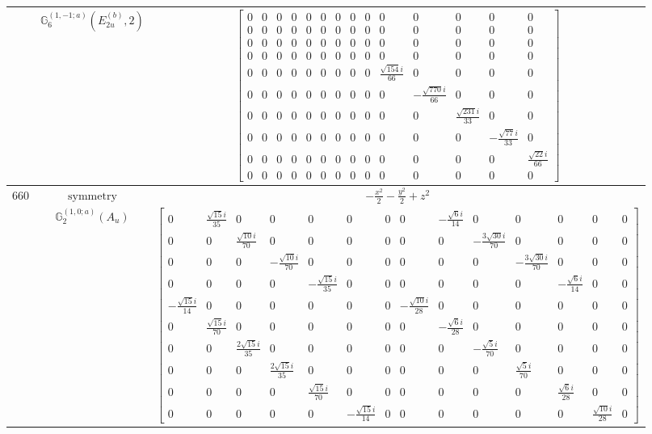 \documentclass[fleqn,8pt,landscape]{jsarticle}
\begin{document}
\begin{longtable}{ccc}
$  $ & $ \mathbb{G}_{6}^{(1,-1;a)}(E_{2u}^{(b)},2) $ & $ \begin{bmatrix} 0 & 0 & 0 & 0 & 0 & 0 & 0 & 0 & 0 & 0 & 0 & 0 & 0 & 0 \\ 0 & 0 & 0 & 0 & 0 & 0 & 0 & 0 & 0 & 0 & 0 & 0 & 0 & 0 \\ 0 & 0 & 0 & 0 & 0 & 0 & 0 & 0 & 0 & 0 & 0 & 0 & 0 & 0 \\ 0 & 0 & 0 & 0 & 0 & 0 & 0 & 0 & 0 & 0 & 0 & 0 & 0 & 0 \\ 0 & 0 & 0 & 0 & 0 & 0 & 0 & 0 & 0 & \frac{\sqrt{154} i}{66} & 0 & 0 & 0 & 0 \\ 0 & 0 & 0 & 0 & 0 & 0 & 0 & 0 & 0 & 0 & - \frac{\sqrt{770} i}{66} & 0 & 0 & 0 \\ 0 & 0 & 0 & 0 & 0 & 0 & 0 & 0 & 0 & 0 & 0 & \frac{\sqrt{231} i}{33} & 0 & 0 \\ 0 & 0 & 0 & 0 & 0 & 0 & 0 & 0 & 0 & 0 & 0 & 0 & - \frac{\sqrt{77} i}{33} & 0 \\ 0 & 0 & 0 & 0 & 0 & 0 & 0 & 0 & 0 & 0 & 0 & 0 & 0 & \frac{\sqrt{22} i}{66} \\ 0 & 0 & 0 & 0 & 0 & 0 & 0 & 0 & 0 & 0 & 0 & 0 & 0 & 0 \end{bmatrix} $ \\ \hline
$ 660 $ & $ \text{symmetry} $ & $ - \frac{x^{2}}{2} - \frac{y^{2}}{2} + z^{2} $ \\
$  $ & $ \mathbb{G}_{2}^{(1,0;a)}(A_{u}) $ & $ \begin{bmatrix} 0 & \frac{\sqrt{15} i}{35} & 0 & 0 & 0 & 0 & 0 & 0 & - \frac{\sqrt{6} i}{14} & 0 & 0 & 0 & 0 & 0 \\ 0 & 0 & \frac{\sqrt{10} i}{70} & 0 & 0 & 0 & 0 & 0 & 0 & - \frac{3 \sqrt{30} i}{70} & 0 & 0 & 0 & 0 \\ 0 & 0 & 0 & - \frac{\sqrt{10} i}{70} & 0 & 0 & 0 & 0 & 0 & 0 & - \frac{3 \sqrt{30} i}{70} & 0 & 0 & 0 \\ 0 & 0 & 0 & 0 & - \frac{\sqrt{15} i}{35} & 0 & 0 & 0 & 0 & 0 & 0 & - \frac{\sqrt{6} i}{14} & 0 & 0 \\ - \frac{\sqrt{15} i}{14} & 0 & 0 & 0 & 0 & 0 & 0 & - \frac{\sqrt{10} i}{28} & 0 & 0 & 0 & 0 & 0 & 0 \\ 0 & \frac{\sqrt{15} i}{70} & 0 & 0 & 0 & 0 & 0 & 0 & - \frac{\sqrt{6} i}{28} & 0 & 0 & 0 & 0 & 0 \\ 0 & 0 & \frac{2 \sqrt{15} i}{35} & 0 & 0 & 0 & 0 & 0 & 0 & - \frac{\sqrt{5} i}{70} & 0 & 0 & 0 & 0 \\ 0 & 0 & 0 & \frac{2 \sqrt{15} i}{35} & 0 & 0 & 0 & 0 & 0 & 0 & \frac{\sqrt{5} i}{70} & 0 & 0 & 0 \\ 0 & 0 & 0 & 0 & \frac{\sqrt{15} i}{70} & 0 & 0 & 0 & 0 & 0 & 0 & \frac{\sqrt{6} i}{28} & 0 & 0 \\ 0 & 0 & 0 & 0 & 0 & - \frac{\sqrt{15} i}{14} & 0 & 0 & 0 & 0 & 0 & 0 & \frac{\sqrt{10} i}{28} & 0 \end{bmatrix} $ \\ \hline

\end{longtable}
\end{document}

